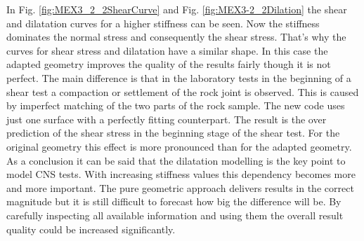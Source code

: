 In Fig. \ref{fig:MEX3_2_2ShearCurve} and Fig. \ref{fig:MEX3-2_2Dilation} the shear and dilatation curves for a higher stiffness can be seen. Now the stiffness dominates the normal stress and consequently the shear stress. That's why the curves for shear stress and dilatation have a similar shape. In this case the adapted geometry improves the quality of the results fairly though it is not perfect. The main difference is that in the laboratory tests in the beginning of a shear test a compaction or settlement of the rock joint is observed. This is caused by imperfect matching of the two parts of the rock sample. The new code uses just one surface with a perfectly fitting counterpart. The result is the over prediction of the shear stress in the beginning stage of the shear test. For the original geometry this effect is more pronounced than for the adapted geometry.\\
As a conclusion it can be said that the dilatation modelling is the key point to model CNS tests. With increasing stiffness values this dependency becomes more and more important. The pure geometric approach delivers results in the correct magnitude but it is still difficult to forecast how big the difference will be. By carefully inspecting all available information and using them the overall result quality could be increased significantly.\\